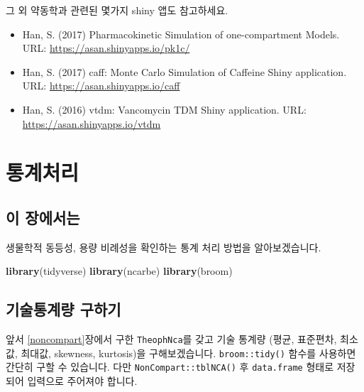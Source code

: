 \documentclass[12pt,]{krantz}
\newenvironment{Shaded}{\begin{snugshade}}{\end{snugshade}}
\newcommand{\KeywordTok}[1]{\textcolor[rgb]{0.13,0.29,0.53}{\textbf{#1}}}
\newcommand{\DataTypeTok}[1]{\textcolor[rgb]{0.13,0.29,0.53}{#1}}
\newcommand{\DecValTok}[1]{\textcolor[rgb]{0.00,0.00,0.81}{#1}}
\newcommand{\StringTok}[1]{\textcolor[rgb]{0.31,0.60,0.02}{#1}}
\newcommand{\OtherTok}[1]{\textcolor[rgb]{0.56,0.35,0.01}{#1}}
\newcommand{\OperatorTok}[1]{\textcolor[rgb]{0.81,0.36,0.00}{\textbf{#1}}}
\newcommand{\NormalTok}[1]{#1}
\providecommand{\tightlist}{%
  \setlength{\itemsep}{0pt}\setlength{\parskip}{0pt}}
\theoremstyle{definition}
\theoremstyle{definition}
\theoremstyle{definition}
\theoremstyle{remark}
\begin{document}
그 외 약동학과 관련된 몇가지 shiny 앱도 참고하세요.

\begin{itemize}
\tightlist
\item
  Han, S. (2017) Pharmacokinetic Simulation of one-compartment Models.
  URL: \url{https://asan.shinyapps.io/pk1c/}
\item
  Han, S. (2017) caff: Monte Carlo Simulation of Caffeine Shiny
  application. URL: \url{https://asan.shinyapps.io/caff}
\item
  Han, S. (2016) vtdm: Vancomycin TDM Shiny application. URL:
  \url{https://asan.shinyapps.io/vtdm}
\end{itemize}

\chapter{통계처리}\label{statistics}

\section{이 장에서는}\label{stat-intro}

생물학적 동등성, 용량 비례성을 확인하는 통계 처리 방법을 알아보겠습니다.

\begin{Shaded}
\begin{Highlighting}[]
\KeywordTok{library}\NormalTok{(tidyverse)}
\KeywordTok{library}\NormalTok{(ncarbe)}
\KeywordTok{library}\NormalTok{(broom)}
\end{Highlighting}
\end{Shaded}

\section{기술통계량 구하기}\label{-}

앞서 \ref{noncompart}장에서 구한 \texttt{TheophNca}를 갖고 기술 통계량
(평균, 표준편차, 최소값, 최대값, skewness, kurtosis)을 구해보겠습니다.
\texttt{broom::tidy()} 함수를 사용하면 간단히 구할 수 있습니다. 다만
\texttt{NonCompart::tblNCA()} 후 \texttt{data.frame} 형태로 저장되어
입력으로 주어져야 합니다.

\begin{Shaded}
\end{Shaded}
\end{document}
